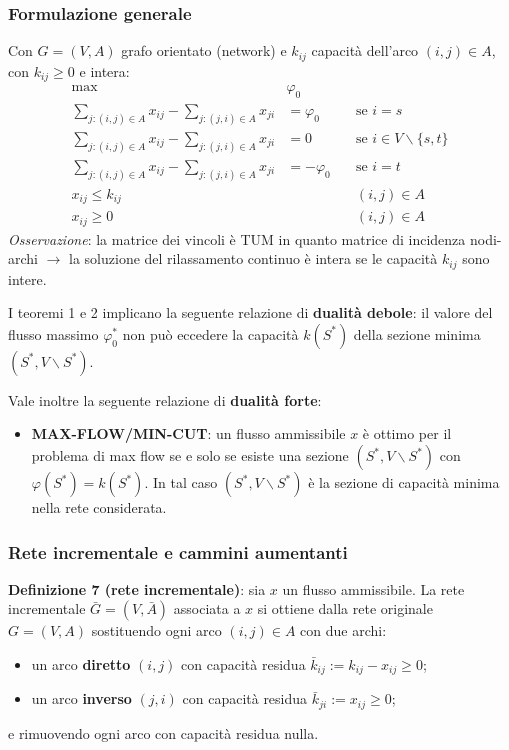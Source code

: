 \subsubsection*{Formulazione generale}
Con $G=(V,A)$ grafo orientato (network) e $k_{ij}$ capacità dell'arco $(i,j)\in A$, con $k_{ij}\ge 0$ e intera:
\begin{equation*}
	\begin{aligned}
		\max \quad & \varphi_0\\
		\sum_{j:(i,j)\in A}x_{ij}-\sum_{j:(j,i)\in A}x_{ji} & =\varphi_0 \quad & \textrm{se } i=s\\
		\sum_{j:(i,j)\in A}x_{ij}-\sum_{j:(j,i)\in A}x_{ji} & =0 \quad & \textrm{se } i\in V\backslash \{s,t\}\\
		\sum_{j:(i,j)\in A}x_{ij}-\sum_{j:(j,i)\in A}x_{ji} & =-\varphi_0 \quad & \textrm{se } i=t\\
		x_{ij}\le k_{ij} \quad & & (i,j)\in A\\
		x_{ij}\ge 0 \quad & & (i,j)\in A
	\end{aligned}
\end{equation*}
\textit{Osservazione}: la matrice dei vincoli è TUM in quanto matrice di incidenza nodi-archi $\rightarrow$ la soluzione del rilassamento continuo è intera se le capacità $k_{ij}$ sono intere.

I teoremi 1 e 2 implicano la seguente relazione di \textbf{dualità debole}: il valore del flusso massimo $\varphi_0^*$ non può eccedere la capacità $k(S^*)$ della sezione minima $(S^*,V\backslash S^*)$.

Vale inoltre la seguente relazione di \textbf{dualità forte}:
\begin{itemize}
	\item \textbf{MAX-FLOW/MIN-CUT}: un flusso ammissibile $x$ è ottimo per il problema di max flow se e solo se esiste una sezione $(S^*,V\backslash S^*)$ con $\varphi (S^*)=k(S^*)$. In tal caso $(S^*,V\backslash S^*)$ è la sezione di capacità minima nella rete considerata.
\end{itemize}

\subsubsection*{Rete incrementale e cammini aumentanti}
\textbf{Definizione 7 (rete incrementale)}: sia $x$ un flusso ammissibile. La rete incrementale $\bar{G}=(V,\bar{A})$ associata a $x$ si ottiene dalla rete originale $G=(V,A)$ sostituendo ogni arco $(i,j)\in A$ con due archi:
\begin{itemize}
	\item un arco \textbf{diretto} $(i,j)$ con capacità residua $\bar{k}_{ij}:=k_{ij}-x_{ij}\ge 0$;
	\item un arco \textbf{inverso} $(j,i)$ con capacità residua $\bar{k}_{ji}:=x_{ij}\ge 0$;
\end{itemize}
e rimuovendo ogni arco con capacità residua nulla.\\


